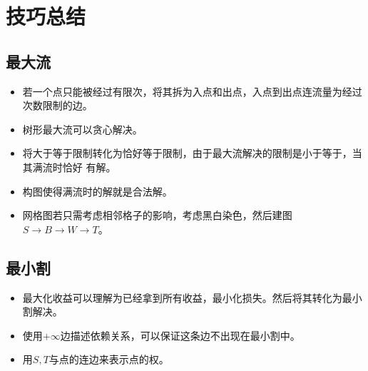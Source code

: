\section{技巧总结}
\subsection{最大流}
\begin{itemize}
    \item 若一个点只能被经过有限次，将其拆为入点和出点，入点到出点连流量为经过次数限制的边。
    \item 树形最大流可以贪心解决。
    \item 将大于等于限制转化为恰好等于限制，由于最大流解决的限制是小于等于，当其满流时恰好
    有解。
    \item 构图使得满流时的解就是合法解。
    \item 网格图若只需考虑相邻格子的影响，考虑黑白染色，然后建图
	$S\rightarrow B\rightarrow W\rightarrow T$。
\end{itemize}
\subsection{最小割}
\begin{itemize}
    \item 最大化收益可以理解为已经拿到所有收益，最小化损失。然后将其转化为最小割解决。
    \item 使用$+\infty$边描述依赖关系，可以保证这条边不出现在最小割中。
    \item 用$S,T$与点的连边来表示点的权。
\end{itemize}
